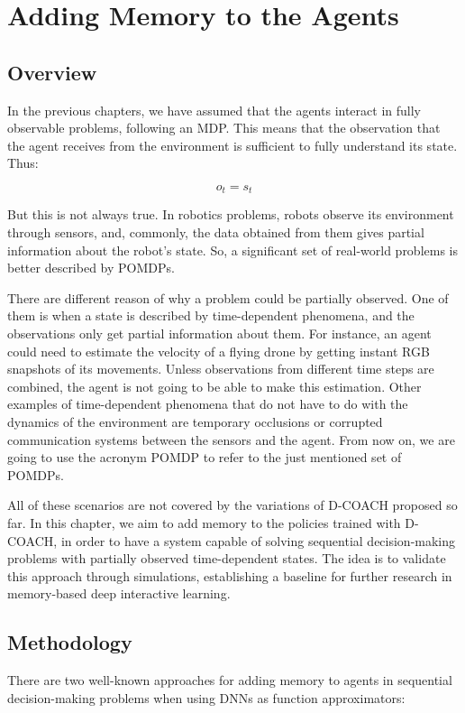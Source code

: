 \chapter{Adding Memory to the Agents}
\section{Overview}
In the previous chapters, we have assumed that the agents interact in fully observable problems, following an MDP. This means that the observation that the agent receives from the environment is sufficient to fully understand its state. Thus:

\begin{equation}
    o_{t} = s_{t}
\end{equation}

But this is not always true. In robotics problems, robots observe its environment through sensors, and, commonly, the data obtained from them gives partial information about the robot's state. So, a significant set of real-world problems is better described by POMDPs.

There are different reason of why a problem could be partially observed. One of them is when a state is described by time-dependent phenomena, and the observations only get partial information about them. For instance, an agent could need to estimate the velocity of a flying drone by getting instant RGB snapshots of its movements. Unless observations from different time steps are combined, the agent is not going to be able to make this estimation. Other examples of time-dependent phenomena that do not have to do with the dynamics of the environment are temporary occlusions or corrupted communication systems between the sensors and the agent. From now on, we are going to use the acronym POMDP to refer to the just mentioned set of POMDPs.

All of these scenarios are not covered by the variations of D-COACH proposed so far. In this chapter, we aim to add memory to the policies trained with D-COACH, in order to have a system capable of solving sequential decision-making problems with partially observed time-dependent states. The idea is to validate this approach through simulations, establishing a baseline for further research in memory-based deep interactive learning.
\newpage

\section{Methodology}
There are two well-known approaches for adding memory to agents in sequential decision-making problems when using DNNs as function approximators:

